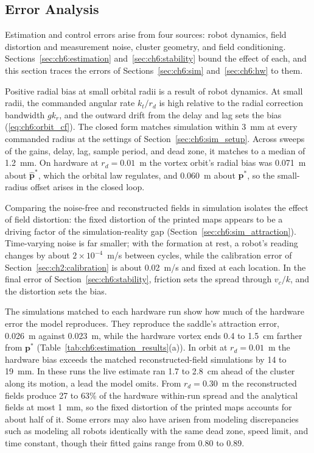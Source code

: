 \subsection{Error Analysis}
\label{sec:ch6:error}

Estimation and control errors arise from four sources: robot dynamics, field distortion and measurement noise, cluster geometry, and field conditioning. Sections~\ref{sec:ch6:estimation} and~\ref{sec:ch6:stability} bound the effect of each, and this section traces the errors of Sections~\ref{sec:ch6:sim} and~\ref{sec:ch6:hw} to them.

Positive radial bias at small orbital radii is a result of robot dynamics. At small radii, the commanded angular rate $k_t / r_d$ is high relative to the radial correction bandwidth $gk_r$, and the outward drift from the delay and lag sets the bias (\ref{eq:ch6:orbit_cf}). The closed form matches simulation within 3~mm at every commanded radius at the settings of Section~\ref{sec:ch6:sim_setup}. Across sweeps of the gains, delay, lag, sample period, and dead zone, it matches to a median of 1.2~mm. On hardware at $r_d = 0.01$~m the vortex orbit's radial bias was 0.071~m about $\hat{\mathbf{p}}^*$, which the orbital law regulates, and 0.060~m about $\mathbf{p}^*$, so the small-radius offset arises in the closed loop.

Comparing the noise-free and reconstructed fields in simulation isolates the effect of field distortion: the fixed distortion of the printed maps appears to be a driving factor of the simulation-reality gap (Section~\ref{sec:ch6:sim_attraction}). Time-varying noise is far smaller; with the formation at rest, a robot's reading changes by about $2\times10^{-4}$~m/s between cycles, while the calibration error of Section~\ref{sec:ch2:calibration} is about 0.02~m/s and fixed at each location. In the final error of Section~\ref{sec:ch6:stability}, friction sets the spread through $v_c/k$, and the distortion sets the bias.

The simulations matched to each hardware run show how much of the hardware error the model reproduces. They reproduce the saddle's attraction error, 0.026~m against 0.023~m, while the hardware vortex ends 0.4 to 1.5~cm farther from $\mathbf{p}^*$ (Table~\ref{tab:ch6:estimation_results}(a)). In orbit at $r_d = 0.01$~m the hardware bias exceeds the matched reconstructed-field simulations by 14 to 19~mm. In these runs the live estimate ran 1.7 to 2.8~cm ahead of the cluster along its motion, a lead the model omits. From $r_d = 0.30$~m the reconstructed fields produce 27 to 63\% of the hardware within-run spread and the analytical fields at most 1~mm, so the fixed distortion of the printed maps accounts for about half of it. Some errors may also have arisen from modeling discrepancies such as modeling all robots identically with the same dead zone, speed limit, and time constant, though their fitted gains range from 0.80 to 0.89.

